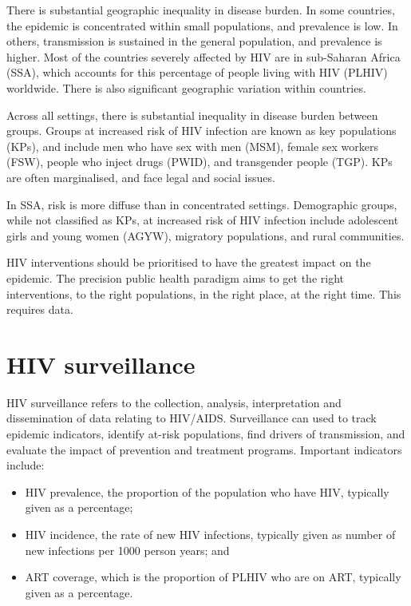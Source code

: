 \documentclass[a4paper, nobind]{templates/ociamthesis}
\providecommand{\tightlist}{%
  \setlength{\itemsep}{0pt}\setlength{\parskip}{0pt}}
\begin{document}
There is substantial geographic inequality in disease burden.
In some countries, the epidemic is concentrated within small populations, and prevalence is low.
In others, transmission is sustained in the general population, and prevalence is higher.
Most of the countries severely affected by HIV are in sub-Saharan Africa (SSA), which accounts for this percentage of people living with HIV (PLHIV) worldwide.
There is also significant geographic variation within countries.

Across all settings, there is substantial inequality in disease burden between groups.
Groups at increased risk of HIV infection are known as key populations (KPs), and include men who have sex with men (MSM), female sex workers (FSW), people who inject drugs (PWID), and transgender people (TGP).
KPs are often marginalised, and face legal and social issues.

In SSA, risk is more diffuse than in concentrated settings.
Demographic groups, while not classified as KPs, at increased risk of HIV infection include adolescent girls and young women (AGYW), migratory populations, and rural communities.

HIV interventions should be prioritised to have the greatest impact on the epidemic.
The precision public health paradigm aims to get the right interventions, to the right populations, in the right place, at the right time.
This requires data.

\hypertarget{hiv-surveillance}{%
\section{HIV surveillance}\label{hiv-surveillance}}

HIV surveillance refers to the collection, analysis, interpretation and dissemination of data relating to HIV/AIDS.
Surveillance can used to track epidemic indicators, identify at-risk populations, find drivers of transmission, and evaluate the impact of prevention and treatment programs.
Important indicators include:

\begin{itemize}
\tightlist
\item
  HIV prevalence, the proportion of the population who have HIV, typically given as a percentage;
\item
  HIV incidence, the rate of new HIV infections, typically given as number of new infections per 1000 person years; and
\item
  ART coverage, which is the proportion of PLHIV who are on ART, typically given as a percentage.
\end{itemize}
\end{document}

